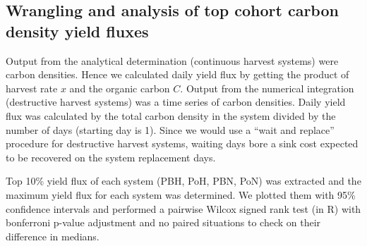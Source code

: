 \documentclass[../thesis.tex]{subfiles} %
\begin{document}
\subsection{Wrangling and analysis of top cohort carbon density yield fluxes}
Output from the analytical determination (continuous harvest systems) were carbon densities.  Hence we calculated daily yield flux by getting the product of harvest rate $x$ and the organic carbon $C$.  Output from the numerical integration (destructive harvest systems) was a time series of carbon densities.  Daily yield flux was calculated by the total carbon density in the system divided by the number of days (starting day is 1).  Since we would use a “wait and replace” procedure for destructive harvest systems, waiting days bore a sink cost expected to be recovered on the system replacement days.

Top 10\% yield flux of each system (PBH, PoH, PBN, PoN) was extracted and the maximum yield flux for each system was determined.  We plotted them with 95\% confidence intervals and performed a pairwise Wilcox signed rank test (in R) with bonferroni p-value adjustment and no paired situations to check on their difference in medians.
\end{document}
